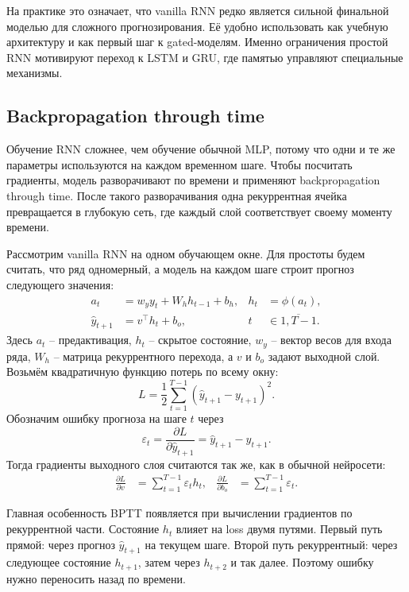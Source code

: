 \documentclass[12pt,fleqn]{article}
\begin{document}
На практике это означает, что vanilla RNN редко является сильной финальной моделью для сложного прогнозирования.
Её удобно использовать как учебную архитектуру и как первый шаг к gated-моделям.
Именно ограничения простой RNN мотивируют переход к LSTM и GRU, где памятью управляют специальные механизмы.

\subsection{Backpropagation through time}
\label{sec:bptt}

Обучение RNN сложнее, чем обучение обычной MLP, потому что одни и те же параметры используются на каждом временном шаге.
Чтобы посчитать градиенты, модель разворачивают по времени и применяют backpropagation through time.
После такого разворачивания одна рекуррентная ячейка превращается в глубокую сеть, где каждый слой соответствует своему моменту времени.


Рассмотрим vanilla RNN на одном обучающем окне.
Для простоты будем считать, что ряд одномерный, а модель на каждом шаге строит прогноз следующего значения:
\begin{align}
  a_t &= w_y y_t + W_h h_{t-1} + b_h,
  &
  h_t &= \phi(a_t),
  \\
  \hat{y}_{t+1} &= v^\top h_t + b_o,
  &
  t &\in \overline{1, T-1}.
\end{align}
Здесь $a_t$ -- предактивация, $h_t$ -- скрытое состояние, $w_y$ -- вектор весов для входа ряда, $W_h$ -- матрица рекуррентного перехода, а $v$ и $b_o$ задают выходной слой.
Возьмём квадратичную функцию потерь по всему окну:
\begin{equation}
  L
  =
  \frac{1}{2}
  \sum_{t=1}^{T-1}
  (\hat{y}_{t+1} - y_{t+1})^2.
\end{equation}
Обозначим ошибку прогноза на шаге $t$ через
\begin{equation}
  \varepsilon_t
  =
  \frac{\partial L}{\partial \hat{y}_{t+1}}
  =
  \hat{y}_{t+1} - y_{t+1}.
\end{equation}
Тогда градиенты выходного слоя считаются так же, как в обычной нейросети:
\begin{align}
  \frac{\partial L}{\partial v}
  &=
  \sum_{t=1}^{T-1}
  \varepsilon_t h_t,
  &
  \frac{\partial L}{\partial b_o}
  &=
  \sum_{t=1}^{T-1}
  \varepsilon_t.
\end{align}

Главная особенность BPTT появляется при вычислении градиентов по рекуррентной части.
Состояние $h_t$ влияет на loss двумя путями.
Первый путь прямой: через прогноз $\hat{y}_{t+1}$ на текущем шаге.
Второй путь рекуррентный: через следующее состояние $h_{t+1}$, затем через $h_{t+2}$ и так далее.
Поэтому ошибку нужно переносить назад по времени.
\end{document}
